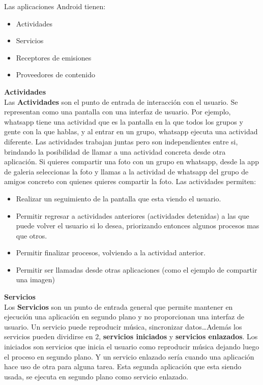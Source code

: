 Las aplicaciones Android tienen:
\begin{itemize}
    \item Actividades
    \item Servicios
    \item Receptores de emisiones
    \item Proveedores de contenido
\end{itemize}
\vspace{0.5cm}
\textbf{Actividades} \\
Las \textbf{Actividades} son el punto de entrada de interacción con el usuario. Se representan como una pantalla con una interfaz de usuario. Por ejemplo, whatsapp tiene una actividad que es la pantalla en la que todos los grupos y gente con la que hablas, y al entrar en un grupo, whatsapp ejecuta una actividad diferente. Las actividades trabajan juntas pero son independientes entre si, brindando la posibilidad de llamar a una actividad concreta desde otra aplicación. Si quieres compartir una foto con un grupo en whatsapp, desde la app de galeria seleccionas la foto y llamas a la actividad de whatsapp del grupo de amigos concreto con quienes quieres compartir la foto. Las actividades permiten:

\begin{itemize}
\item Realizar un seguimiento de la pantalla que esta viendo el usuario.
\item Permitir regresar a actividades anteriores (actividades detenidas) a las que puede volver el usuario si lo desea, priorizando entonces algunos procesos mas que otros.
\item Permitir finalizar procesos, volviendo a la actividad anterior.
\item Permitir ser llamadas desde otras aplicaciones (como el ejemplo de compartir una imagen)
\end{itemize}

\vspace{0.5cm}
\textbf{Servicios} \\
Los \textbf{Servicios} son un punto de entrada general que permite mantener en ejecución una aplicación en segundo plano y no proporcionan una interfaz de usuario. Un servicio puede reproducir música, sincronizar datos\dots Además los servicios pueden dividirse en 2, \textbf{servicios iniciados} y \textbf{servicios enlazados}. Los iniciados son servicios que inicia el usuario como reproducir música dejando luego el proceso en segundo plano. Y un servicio enlazado sería cuando una aplicación hace uso de otra para alguna tarea. Esta segunda aplicación que esta siendo usada, se ejecuta en segundo plano como servicio enlazado. \\

